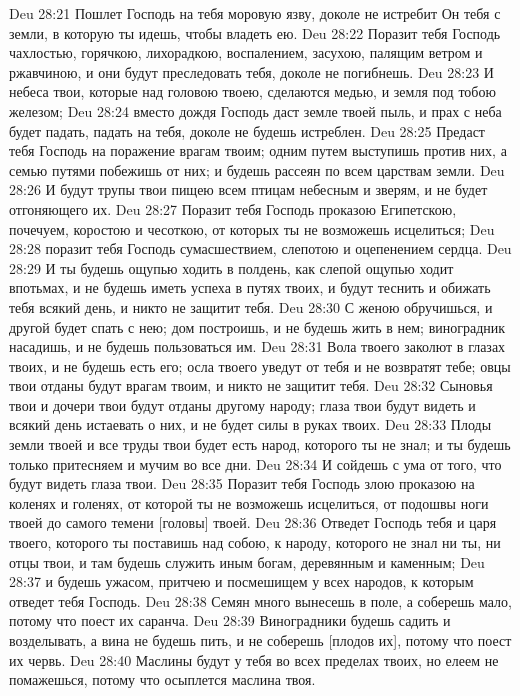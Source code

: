 Deu 28:21  Пошлет Господь на тебя моровую язву, доколе не истребит Он тебя с земли, в которую ты идешь, чтобы владеть ею.
Deu 28:22  Поразит тебя Господь чахлостью, горячкою, лихорадкою, воспалением, засухою, палящим ветром и ржавчиною, и они будут преследовать тебя, доколе не погибнешь.
Deu 28:23  И небеса твои, которые над головою твоею, сделаются медью, и земля под тобою железом;
Deu 28:24  вместо дождя Господь даст земле твоей пыль, и прах с неба будет падать, падать на тебя, доколе не будешь истреблен.
Deu 28:25  Предаст тебя Господь на поражение врагам твоим; одним путем выступишь против них, а семью путями побежишь от них; и будешь рассеян по всем царствам земли.
Deu 28:26  И будут трупы твои пищею всем птицам небесным и зверям, и не будет отгоняющего их.
Deu 28:27  Поразит тебя Господь проказою Египетскою, почечуем, коростою и чесоткою, от которых ты не возможешь исцелиться;
Deu 28:28  поразит тебя Господь сумасшествием, слепотою и оцепенением сердца.
Deu 28:29  И ты будешь ощупью ходить в полдень, как слепой ощупью ходит впотьмах, и не будешь иметь успеха в путях твоих, и будут теснить и обижать тебя всякий день, и никто не защитит тебя.
Deu 28:30  С женою обручишься, и другой будет спать с нею; дом построишь, и не будешь жить в нем; виноградник насадишь, и не будешь пользоваться им.
Deu 28:31  Вола твоего заколют в глазах твоих, и не будешь есть его; осла твоего уведут от тебя и не возвратят тебе; овцы твои отданы будут врагам твоим, и никто не защитит тебя.
Deu 28:32  Сыновья твои и дочери твои будут отданы другому народу; глаза твои будут видеть и всякий день истаевать о них, и не будет силы в руках твоих.
Deu 28:33  Плоды земли твоей и все труды твои будет есть народ, которого ты не знал; и ты будешь только притесняем и мучим во все дни.
Deu 28:34  И сойдешь с ума от того, что будут видеть глаза твои.
Deu 28:35  Поразит тебя Господь злою проказою на коленях и голенях, от которой ты не возможешь исцелиться, от подошвы ноги твоей до самого темени [головы] твоей.
Deu 28:36  Отведет Господь тебя и царя твоего, которого ты поставишь над собою, к народу, которого не знал ни ты, ни отцы твои, и там будешь служить иным богам, деревянным и каменным;
Deu 28:37  и будешь ужасом, притчею и посмешищем у всех народов, к которым отведет тебя Господь.
Deu 28:38  Семян много вынесешь в поле, а соберешь мало, потому что поест их саранча.
Deu 28:39  Виноградники будешь садить и возделывать, а вина не будешь пить, и не соберешь [плодов их], потому что поест их червь.
Deu 28:40  Маслины будут у тебя во всех пределах твоих, но елеем не помажешься, потому что осыплется маслина твоя.
